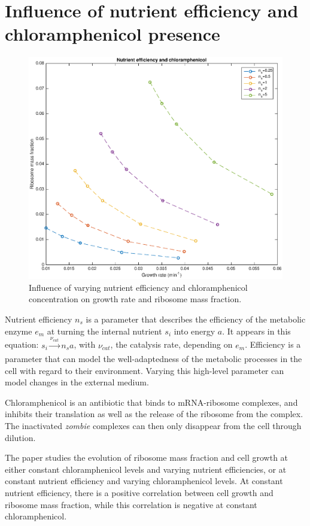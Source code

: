 \documentclass[a4paper]{article}
\begin{document}
\section{Influence of nutrient efficiency and chloramphenicol presence}

\begin{figure}[h]
\includegraphics[width=\textwidth]{chlor.eps}
\caption{Influence of varying nutrient efficiency and chloramphenicol concentration on growth rate and ribosome mass fraction.}
\label{chlor}
\end{figure}

Nutrient efficiency $n_s$ is a parameter that describes the efficiency of the metabolic enzyme $e_m$ at turning the internal nutrient $s_i$ into energy $a$.
It appears in this equation: $s_i \xrightarrow[]{\nu_{cat}}n_sa$, with $\nu_{cat}$, the catalysis rate, depending on $e_m$.
Efficiency is a parameter that can model the well-adaptedness of the metabolic processes in the cell with regard to their environment.
Varying this high-level parameter can model changes in the external medium. 

Chloramphenicol is an antibiotic that binds to mRNA-ribosome complexes, and inhibits their translation as well as the release of the ribosome from the complex.
The inactivated \emph{zombie} complexes can then only disappear from the cell through dilution.

The paper studies the evolution of ribosome mass fraction and cell growth at either constant chloramphenicol levels and varying nutrient efficiencies, or at constant nutrient efficiency and varying chloramphenicol levels.
At constant nutrient efficiency, there is a positive correlation between cell growth and ribosome mass fraction, while this correlation is negative at constant chloramphenicol.
\end{document}
